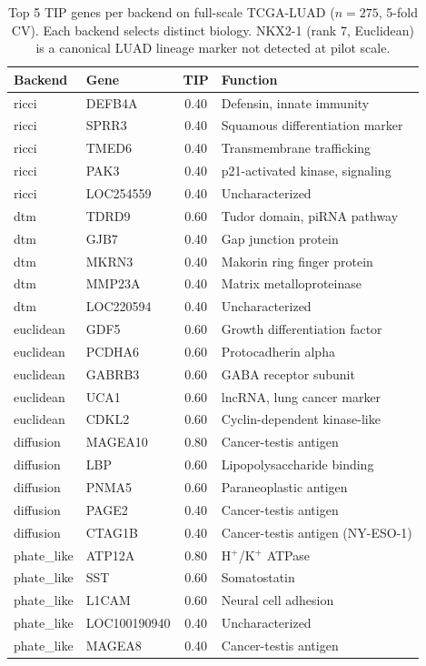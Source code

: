 \documentclass[12pt]{article}
\begin{document}
\begin{table}[h]
\centering\small
\begin{tabular}{llcl}
\toprule
\textbf{Backend} & \textbf{Gene} & \textbf{TIP} & \textbf{Function} \\
\midrule
ricci & DEFB4A & 0.40 & Defensin, innate immunity \\
ricci & SPRR3 & 0.40 & Squamous differentiation marker \\
ricci & TMED6 & 0.40 & Transmembrane trafficking \\
ricci & PAK3 & 0.40 & p21-activated kinase, signaling \\
ricci & LOC254559 & 0.40 & Uncharacterized \\
\midrule
dtm & TDRD9 & 0.60 & Tudor domain, piRNA pathway \\
dtm & GJB7 & 0.40 & Gap junction protein \\
dtm & MKRN3 & 0.40 & Makorin ring finger protein \\
dtm & MMP23A & 0.40 & Matrix metalloproteinase \\
dtm & LOC220594 & 0.40 & Uncharacterized \\
\midrule
euclidean & GDF5 & 0.60 & Growth differentiation factor \\
euclidean & PCDHA6 & 0.60 & Protocadherin alpha \\
euclidean & GABRB3 & 0.60 & GABA receptor subunit \\
euclidean & UCA1 & 0.60 & lncRNA, lung cancer marker \\
euclidean & CDKL2 & 0.60 & Cyclin-dependent kinase-like \\
\midrule
diffusion & MAGEA10 & 0.80 & Cancer-testis antigen \\
diffusion & LBP & 0.60 & Lipopolysaccharide binding \\
diffusion & PNMA5 & 0.60 & Paraneoplastic antigen \\
diffusion & PAGE2 & 0.40 & Cancer-testis antigen \\
diffusion & CTAG1B & 0.40 & Cancer-testis antigen (NY-ESO-1) \\
\midrule
phate\_like & ATP12A & 0.80 & H$^+$/K$^+$ ATPase \\
phate\_like & SST & 0.60 & Somatostatin \\
phate\_like & L1CAM & 0.60 & Neural cell adhesion \\
phate\_like & LOC100190940 & 0.40 & Uncharacterized \\
phate\_like & MAGEA8 & 0.40 & Cancer-testis antigen \\
\bottomrule
\end{tabular}
\caption{Top 5 TIP genes per backend on full-scale TCGA-LUAD ($n = 275$, 5-fold CV). Each backend selects distinct biology. NKX2-1 (rank 7, Euclidean) is a canonical LUAD lineage marker not detected at pilot scale.}
\label{tab:fullscale_genes}
\end{table}
\end{document}
